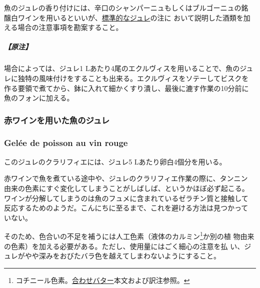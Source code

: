\begin{recette}
魚のジュレの香り付けには、辛口のシャンパーニュもしくはブルゴーニュの銘
醸白ワインを用いるといいが、\protect\hyperlink{gelees-ordinaires}{標準的なジュレ}の注に
おいて説明した酒類を加える場合の注意事項を勘案すること。

\hypertarget{ux539fux6ce8-2}{%
\subparagraph{【原注】}\label{ux539fux6ce8-2}}

場合によっては、ジュレ1 Lあたり4尾のエクルヴィスを用いることで、魚のジュ
レに独特の風味付けをすることも出来る。エクルヴィスをソテーしてビスクを
作る要領で煮てから、鉢に入れて細かくすり潰し、最後に漉す作業の10分前に
魚のフォンに加える。

\maeaki

\hypertarget{ux8d64ux30efux30a4ux30f3ux3092ux7528ux3044ux305fux9b5aux306eux30b8ux30e5ux30ec}{%
\subsubsection{赤ワインを用いた魚のジュレ}\label{ux8d64ux30efux30a4ux30f3ux3092ux7528ux3044ux305fux9b5aux306eux30b8ux30e5ux30ec}}

\hypertarget{gelee-de-poisson-au-vin-rouge}{%
\subsubsection{Gelée de poisson au vin
rouge}\label{gelee-de-poisson-au-vin-rouge}}


このジュレのクラリフィエには、ジュレ5 Lあたり卵白4個分を用いる。

赤ワインで魚を煮ている途中や、ジュレのクラリフィエ作業の際に、タンニン
由来の色素にすぐ変化してしまうことがしばしば、というかほぼ必ず起こる。
ワインが分解してしまうのは魚のフュメに含まれているゼラチン質と接触して
反応するためのようだ。こんにちに至るまで、これを避ける方法は見つかって
いない。

そのため、色合いの不足を補うには人工色素（液体のカルミン\footnote{コチニール色素。\protect\hyperlink{beurres-composes}{合わせバター}本文および訳注参照。}か別の植
物由来の色素）を加える必要がある。ただし、使用量にはごく細心の注意を払
い、ジュレがやや深みをおびたバラ色を越えてしまわないようにすること。
\end{recette}